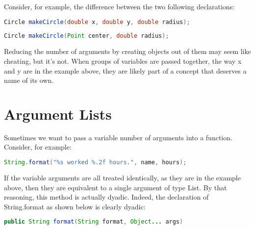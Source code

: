 Consider, for example, the difference between the two following declarations:

\begin{tcolorbox}[breakable, colback=green!10!white, colframe=green!85!black, center title, sidebyside]

\begin{lstlisting}[language = java, basicstyle=\small]
Circle makeCircle(double x, double y, double radius);
\end{lstlisting}

\tcblower

\begin{lstlisting}[language = java, basicstyle=\small]
Circle makeCircle(Point center, double radius);
\end{lstlisting}

\end{tcolorbox}

Reducing the number of arguments by creating objects out of them may seem like cheating, but it’s not. When groups of variables are passed together, the way x and y are in the example above, they are likely part of a concept that deserves a name of its own.

\section{Argument Lists}

Sometimes we want to pass a variable number of arguments into a function. Consider, for example:

\begin{tcolorbox}[breakable, colback=green!10!white, colframe=green!85!black]
\begin{lstlisting}[language = java, basicstyle=\small]
String.format("%s worked %.2f hours.", name, hours);
\end{lstlisting}
\end{tcolorbox}

If the variable arguments are all treated identically, as they are in the example above, then they are equivalent to a single argument of type List. By that reasoning, this method is actually dyadic. Indeed, the declaration of String.format as shown below is clearly dyadic:

\begin{tcolorbox}[breakable, colback=green!10!white, colframe=green!85!black]
\begin{lstlisting}[language = java, basicstyle=\small]
public String format(String format, Object... args)
\end{lstlisting}
\end{tcolorbox}


